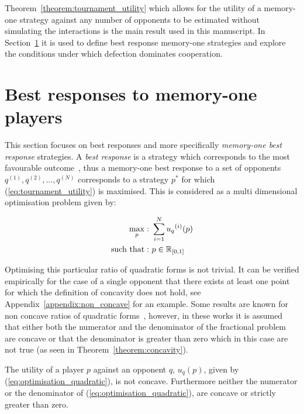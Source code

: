 Theorem~\ref{theorem:tournament_utility} which allows for the utility of a
memory-one strategy against any number of opponents to be estimated without
simulating the interactions is the main result used in this manuscript. In
Section~\ref{section:best_response_mem_one} it is used to  define best response
memory-one strategies and explore the conditions under which defection dominates
cooperation.

\section{Best responses to memory-one players}\label{section:best_response_mem_one}

This section focuses on best responses and more specifically \textit{memory-one
best response} strategies. A \textit{best response} is a strategy which
corresponds to the most favourable outcome~\cite{Tadelis2013}, thus a memory-one
best response to a set of opponents \(q^{(1)}, q^{(2)}, \dots, q^{(N)}\) corresponds to a strategy \(p^*\) for which
(\ref{eq:tournament_utility}) is maximised. This is considered as a multi
dimensional optimisation problem given by:

\begin{equation}\label{eq:mo_tournament_optimisation}
    \begin{aligned}
    \max_p: & \ \sum_{i=1} ^ {N} {u_q}^{(i)} (p)
    \\
    \text{such that}: & \ p \in \mathbb{R}_{[0, 1]}
    \end{aligned}
\end{equation}

Optimising this particular ratio of quadratic forms is not trivial. It can be
verified empirically for the case of a single opponent that there exists at least
one point for which the definition of concavity does not hold, see Appendix~\ref{appendix:non_concave}
for an example. Some results are
known for non concave ratios of quadratic forms~\cite{Beck2009, Hongyan2014},
however, in these works it is assumed that either both the numerator and the
denominator of the fractional problem are concave or that the denominator is
greater than zero which in this case are not true
(as seen in Theorem~\ref{theorem:concavity}).

\begin{theorem}\label{theorem:concavity}
    The utility of a player \(p\) against an opponent \(q\), \(u_q (p)\), given
    by (\ref{eq:optimisation_quadratic}), is not concave. Furthermore neither
    the numerator or the denominator of (\ref{eq:optimisation_quadratic}), are
    concave or strictly greater than zero.
\end{theorem}

